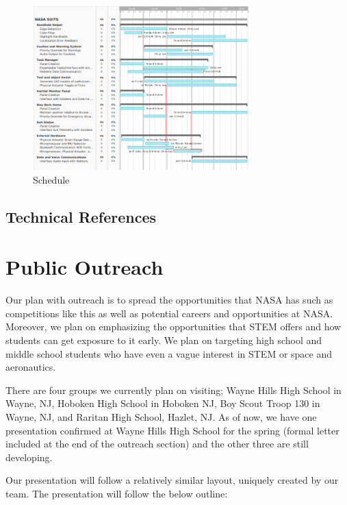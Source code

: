 \documentclass{article}
\let\Oldsection\section
\renewcommand{\section}{\FloatBarrier\Oldsection}
\let\Oldsubsection\subsection
\renewcommand{\subsection}{\FloatBarrier\Oldsubsection}
\begin{document}
\begin{figure}[!htb]
  \centering
  \includegraphics[width=0.75\textwidth]{assets/supertaskschedule.png}
  \caption{Schedule}
  \label{fig:supertaskschedule}
\end{figure}

\subsection{Technical References}

\printbibliography

\newpage

\section{Public Outreach}

Our plan with outreach is to spread the opportunities that NASA has such as competitions like this as well as potential careers and opportunities at NASA. Moreover, we plan on emphasizing the opportunities that STEM offers and how students can get exposure to it early. We plan on targeting high school and middle school students who have even a vague interest in STEM or space and aeronautics.

There are four groups we currently plan on visiting; Wayne Hills High School in Wayne, NJ, Hoboken High School in Hoboken NJ, Boy Scout Troop 130 in Wayne, NJ, and Raritan High School, Hazlet, NJ. As of now, we have one presentation confirmed at Wayne Hills High School for the spring (formal letter included at the end of the outreach section) and the other three are still developing.

Our presentation will follow a relatively similar layout, uniquely created by our team. The presentation will follow the below outline:
\end{document}
